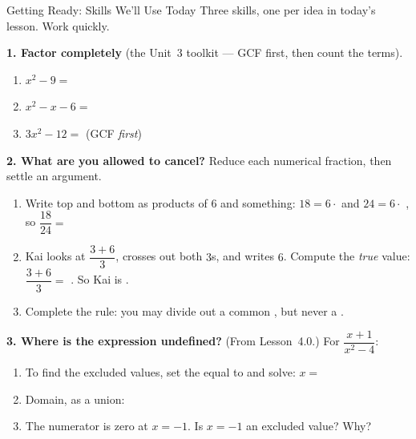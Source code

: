 \documentclass[10pt]{article}
\begin{document}
\namedateperiod

\vspace{0.10in}

\begin{notesbox}{Getting Ready: Skills We'll Use Today}
\small Three skills, one per idea in today's lesson. Work quickly.

\vspace{4pt}
\textbf{1. Factor completely} (the Unit~3 toolkit --- GCF first, then count the terms).
\begin{enumerate}[label=(\alph*), leftmargin=2.1em, itemsep=3pt]
  \item $x^2-9=$ 
  \item $x^2-x-6=$ 
  \item $3x^2-12=$  \quad (GCF \emph{first})
\end{enumerate}

\vspace{4pt}
\textbf{2. What are you allowed to cancel?} Reduce each numerical fraction, then settle an argument.
\begin{enumerate}[label=(\alph*), leftmargin=2.1em, itemsep=3pt]
  \item Write top and bottom as products of $6$ and something: $18=6\cdot$  \; and \;
        $24=6\cdot$ , \; so $\dfrac{18}{24}=$ 
  \item Kai looks at $\dfrac{3+6}{3}$, crosses out both $3$s, and writes $6$. Compute the
        \emph{true} value: $\dfrac{3+6}{3}=$ . \; So Kai is .
  \item Complete the rule: you may divide out a common , but never a
        .
\end{enumerate}

\vspace{4pt}
\textbf{3. Where is the expression undefined?} (From Lesson~4.0.) For
$\dfrac{x+1}{x^2-4}$:
\begin{enumerate}[label=(\alph*), leftmargin=2.1em, itemsep=3pt]
  \item To find the excluded values, set the  equal to  and solve:
        $x=$ 
  \item Domain, as a union: 
  \item The numerator is zero at $x=-1$. Is $x=-1$ an excluded value?  \;
        Why? 
\end{enumerate}

\end{notesbox}
\end{document}
